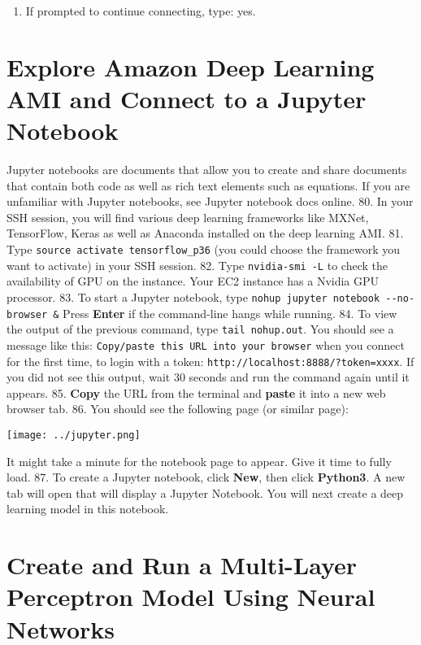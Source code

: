 \documentclass[]{book}
\providecommand{\tightlist}{%
  \setlength{\itemsep}{0pt}\setlength{\parskip}{0pt}}
\begin{document}
\begin{enumerate}
\def\labelenumi{\arabic{enumi}.}
\setcounter{enumi}{78}
\tightlist
\item
  If prompted to continue connecting, type: yes.
\end{enumerate}

\hypertarget{explore-amazon-deep-learning-ami-and-connect-to-a-jupyter-notebook}{%
\chapter{Explore Amazon Deep Learning AMI and Connect to a Jupyter Notebook}\label{explore-amazon-deep-learning-ami-and-connect-to-a-jupyter-notebook}}

Jupyter notebooks are documents that allow you to create and share documents that contain both code as well as rich text elements such as equations. If you are unfamiliar with Jupyter notebooks, see Jupyter notebook docs online.
80. In your SSH session, you will find various deep learning frameworks like MXNet, TensorFlow, Keras as well as Anaconda installed on the deep learning AMI.
81. Type \texttt{source\ activate\ tensorflow\_p36} (you could choose the framework you want to activate) in your SSH session.
82. Type \texttt{nvidia-smi\ -L} to check the availability of GPU on the instance. Your EC2 instance has a Nvidia GPU processor.
83. To start a Jupyter notebook, type \texttt{nohup\ jupyter\ notebook\ -\/-no-browser\ \&}
Press \textbf{Enter} if the command-line hangs while running.
84. To view the output of the previous command, type \texttt{tail\ nohup.out}.
You should see a message like this: \texttt{Copy/paste\ this\ URL\ into\ your\ browser} when you connect for the first time, to login with a token: \texttt{http://localhost:8888/?token=xxxx}.
If you did not see this output, wait 30 seconds and run the command again until it appears.
85. \textbf{Copy} the URL from the terminal and \textbf{paste} it into a new web browser tab.
86. You should see the following page (or similar page):

\texttt{[image: ../jupyter.png]}

It might take a minute for the notebook page to appear. Give it time to fully load.
87. To create a Jupyter notebook, click \textbf{New}, then click \textbf{Python3}. A new tab will open that will display a Jupyter Notebook. You will next create a deep learning model in this notebook.

\hypertarget{create-and-run-a-multi-layer-perceptron-model-using-neural-networks}{%
\chapter{Create and Run a Multi-Layer Perceptron Model Using Neural Networks}\label{create-and-run-a-multi-layer-perceptron-model-using-neural-networks}}
\end{document}
